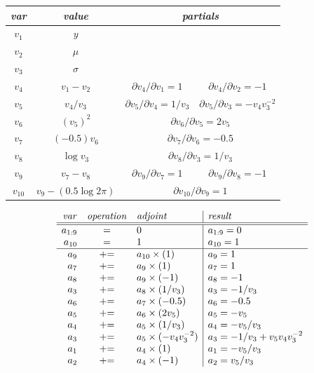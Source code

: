 \documentclass[10pt]{report}
\begin{document}
%
\begin{center}\footnotesize
\begin{tabular}{c||c|cc}
{\it var} & {\it value} & \multicolumn{2}{|c}{\it partials}
\\ \hline \hline
$v_1$ & $y$
\\[2pt]
$v_2$ & $\mu$
\\[2pt]
$v_3$ & $\sigma$
\\[2pt]
$v_4$ & $v_1 - v_2$ & $\partial v_4 / \partial v_1 = 1$
                   & $\partial v_4 / \partial v_2 = -1$
\\[4pt]
$v_5$ & $v_4 / v_3$ & $\partial v_5 / \partial v_4 = 1/v_3$
                    & $\partial v_5 / \partial v_3 = -v_4 v_3^{-2}$
\\[4pt]
$v_6$ & $\left(v_5\right)^2$
      & \multicolumn{2}{c}{$\partial v_6 / \partial v_5 = 2 v_5$}
\\[4pt]
$v_7$ & $(-0.5) v_6$ & \multicolumn{2}{c}{$\partial v_7 / \partial v_6
                                          = -0.5$}
\\[4pt]
$v_8$ & $\log v_3$ & \multicolumn{2}{c}{$\partial v_8 / \partial v_3 = 1/v_3$}
\\[4pt]
$v_9$ & $v_7 - v_8$ & $\partial v_9 / \partial v_7 = 1$
                    & $\partial v_9 / \partial v_8 = -1$
\\[4pt]
$v_{10}$ & $v_9 - (0.5 \log 2\pi)$
         & \multicolumn{2}{c}{$\partial v_{10} / \partial v_9 = 1$}
\end{tabular}
\end{center}

%
{\small
\[
\begin{array}{rcl|l}
{\it var} & {\it operation} & {\it adjoint} & {\it result}
\\ \hline \hline
a_{1:9} & = & 0 & a_{1:9} = 0
\\
a_{10} & = & 1 & a_{10} = 1
\\ \hline
a_{9} & {+}{=} & a_{10} \times (1) & a_9 = 1
\\
a_{7} & {+}{=} & a_9 \times (1) & a_7 = 1
\\
a_{8} & {+}{=} & a_9 \times (-1) & a_8 = -1
\\
a_{3} & {+}{=} & a_8 \times (1 / v_3) & a_3 = -1 / v_3
\\
a_{6} & {+}{=} & a_7 \times (-0.5) & a_6 = -0.5
\\
a_{5} & {+}{=} & a_6 \times (2 v_5) & a_5 = -v_5
\\
a_{4} & {+}{=} & a_5 \times (1 / v_3) & a_4 = -v_5 / v_3
\\
a_{3} & {+}{=} & a_5 \times (-v_4 v_3^{-2}) & a_3 = -1 / v_3 + v_5 v_4 v_3^{-2}
\\
a_{1} & {+}{=} & a_4 \times (1) & a_1 = -v_5 / v_3
\\
a_{2} & {+}{=} & a_4 \times (-1) & a_2 = v_5 / v_3
\end{array}
\]
}
\end{document}
